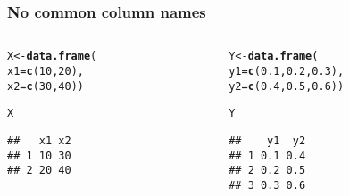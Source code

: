 \documentclass[12pt]{beamer}\usepackage[]{graphicx}\usepackage[]{color}
\makeatletter
\newcommand{\hlnum}[1]{\textcolor[rgb]{0.686,0.059,0.569}{#1}}%
\newcommand{\hlstd}[1]{\textcolor[rgb]{0.345,0.345,0.345}{#1}}%
\newcommand{\hlkwb}[1]{\textcolor[rgb]{0.69,0.353,0.396}{#1}}%
\newcommand{\hlkwc}[1]{\textcolor[rgb]{0.333,0.667,0.333}{#1}}%
\newcommand{\hlkwd}[1]{\textcolor[rgb]{0.737,0.353,0.396}{\textbf{#1}}}%
\newenvironment{kframe}{%
 \def\at@end@of@kframe{}%
 \ifinner\ifhmode%
  \def\at@end@of@kframe{\end{minipage}}%
  \begin{minipage}{\columnwidth}%
 \fi\fi%
 \def\FrameCommand##1{\hskip\@totalleftmargin \hskip-\fboxsep
 \colorbox{shadecolor}{##1}\hskip-\fboxsep
     \hskip-\linewidth \hskip-\@totalleftmargin \hskip\columnwidth}%
 \MakeFramed {\advance\hsize-\width
   \@totalleftmargin\z@ \linewidth\hsize
   \@setminipage}}%
 {\par\unskip\endMakeFramed%
 \at@end@of@kframe}
\newenvironment{knitrout}{}{} %
\makeatother
\begin{document}
\begin{frame}[fragile]
\frametitle{No common column names}

\begin{columns}[t]
\begin{column}{0.4\textwidth}
\begin{knitrout}\footnotesize
{}\color{fgcolor}\begin{kframe}
\begin{alltt}
\hlstd{X} \hlkwb{<-} \hlkwd{data.frame}\hlstd{(}
  \hlkwc{x1} \hlstd{=} \hlkwd{c}\hlstd{(}\hlnum{10}\hlstd{,} \hlnum{20}\hlstd{),}
  \hlkwc{x2} \hlstd{=} \hlkwd{c}\hlstd{(}\hlnum{30}\hlstd{,} \hlnum{40}\hlstd{))}

\hlstd{X}
\end{alltt}
\begin{verbatim}
##   x1 x2
## 1 10 30
## 2 20 40
\end{verbatim}
\end{kframe}
\end{knitrout}
\end{column}

\begin{column}{0.5\textwidth}
\begin{knitrout}\footnotesize
{}\color{fgcolor}\begin{kframe}
\begin{alltt}
\hlstd{Y} \hlkwb{<-} \hlkwd{data.frame}\hlstd{(}
  \hlkwc{y1} \hlstd{=} \hlkwd{c}\hlstd{(}\hlnum{0.1}\hlstd{,} \hlnum{0.2}\hlstd{,} \hlnum{0.3}\hlstd{),}
  \hlkwc{y2} \hlstd{=} \hlkwd{c}\hlstd{(}\hlnum{0.4}\hlstd{,} \hlnum{0.5}\hlstd{,} \hlnum{0.6}\hlstd{))}

\hlstd{Y}
\end{alltt}
\begin{verbatim}
##    y1  y2
## 1 0.1 0.4
## 2 0.2 0.5
## 3 0.3 0.6
\end{verbatim}
\end{kframe}
\end{knitrout}
\end{column}
\end{columns}

\end{frame}

\end{document}
